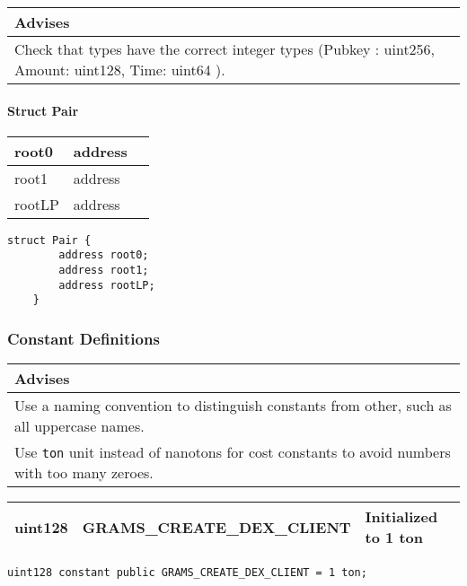 \ifsoldraft
\noindent\begin{tabular}{|p{12cm}|}\hline
\rowcolor{green}Advises
\\\hline
Check that types have the correct integer types (Pubkey : uint256, Amount: uint128, Time: uint64 ).
\\\hline\end{tabular}
\fi

\paragraph{Struct Pair}


\ifsoltables
\noindent\begin{tabular}{|l|l|p{6cm}|}\hline
root0 & address & \\\hline
root1 & address & \\\hline
rootLP & address & \\\hline
\end{tabular}
\fi


\begin{lstlisting}[firstnumber=24]
	struct Pair {
		address root0;
		address root1;
		address rootLP;
	}
\end{lstlisting}

\subsubsection{Constant Definitions}


\ifsoldraft
\noindent\begin{tabular}{|p{12cm}|}\hline
\rowcolor{green}Advises
\\\hline
Use a naming convention to distinguish constants from other, such as all uppercase names.
\\\hline
Use \verb+ton+ unit instead of nanotons for cost constants to avoid numbers with too many zeroes.
\\\hline\end{tabular}
\fi

\ifsoltables
\noindent\begin{tabular}{|l|l|p{5cm}|}\hline
uint128 & GRAMS\_{}CREATE\_{}DEX\_{}CLIENT & Initialized to 1 ton \\\hline
\end{tabular}
\fi


\begin{lstlisting}[firstnumber=42]
	uint128 constant public GRAMS_CREATE_DEX_CLIENT = 1 ton;
\end{lstlisting}

